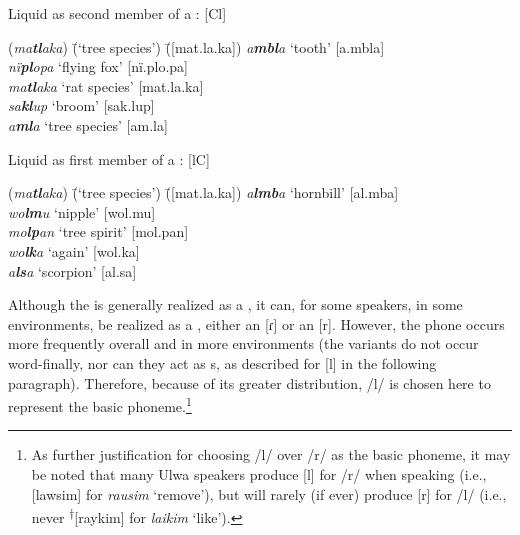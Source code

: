 \newpage

\ea%
    \label{ex:phon:32}
          Liquid as second member of a : [Cl]\\
\begin{tabbing}
{(\textit{ma\textbf{tl}aka})} \= {(‘tree species’)} \= {([mat.la.ka])}\kill
{\textit{a\textbf{mbl}a}} \> {‘tooth’} \> {[a.mbla]}\\
{\textit{nï\textbf{pl}opa}} \> {‘flying fox’} \> {[nï.plo.pa]}\\
{\textit{ma\textbf{tl}aka}} \> {‘rat species’} \> {[mat.la.ka]}\\
{\textit{sa\textbf{kl}up}} \> {‘broom’} \> {[sak.lup]}\\
{\textit{a\textbf{ml}a}} \> {‘tree species’} \> {[am.la]}
\end{tabbing}
\z

\ea%
    \label{ex:phon:32a}
          Liquid as first member of a : [lC]\\
\begin{tabbing}
{(\textit{ma\textbf{tl}aka})} \= {(‘tree species’)} \= {([mat.la.ka])}\kill
{\textit{a\textbf{lmb}a}} \> {‘hornbill’} \> {[al.mba]}\\
{\textit{wo\textbf{lm}u}} \> {‘nipple’} \> {[wol.mu]}\\
{\textit{mo\textbf{lp}an}} \> {‘tree spirit’} \> {[mol.pan]}\\
{\textit{wo\textbf{lk}a}} \> {‘again’} \> {[wol.ka]}\\
{\textit{a\textbf{ls}a}} \> {‘scorpion’} \> {[al.sa]}
\end{tabbing}
\z

Although the  is generally realized as a , it can, for some speakers, in some environments, be realized as a , either an   [ɾ] or an   [r]. However, the  phone occurs more frequently overall and in more environments (the  variants do not occur word-finally, nor can they act as s, as described for [l] in the following paragraph). Therefore, because of its greater distribution, /l/ is chosen here to represent the basic  phoneme.\footnote{As further justification for choosing /l/ over /r/ as the basic phoneme, it may be noted that many Ulwa speakers produce [l] for /r/ when speaking  (i.e., [lawsim] for  \textit{rausim} ‘remove’), but will rarely (if ever) produce [r] for /l/ (i.e., never \textsuperscript{†}[raykim] for  \textit{laikim} ‘like’).}

